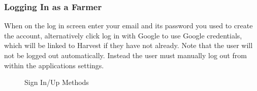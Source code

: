 \documentclass[11pt]{article}
\begin{document}
\subsubsection{Logging In as a Farmer}
When on the log in screen enter your email and its password you used to create the account, alternatively click log in with Google to use Google credentials, which will be linked to Harvest if they have not already. Note that the user will not be logged out automatically. Instead the user must manually log out from within the applications settings.
\begin{figure}%
 \centering
 \qquad
 \qquad
 \qquad
 \caption{Sign In/Up Methods}%
 \label{fig:example}%
\end{figure}
\end{document}
